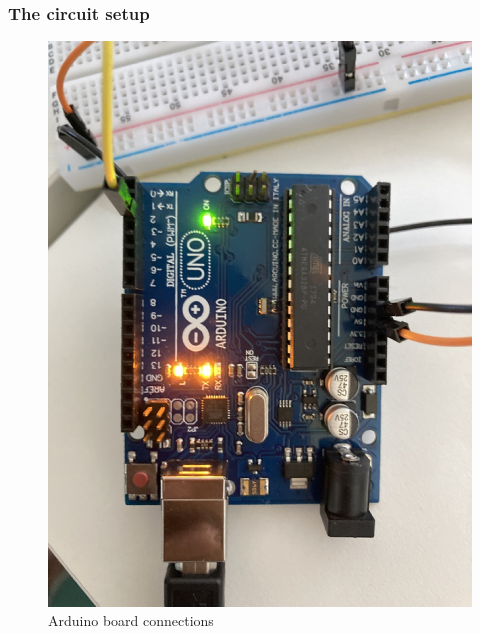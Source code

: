 \documentclass[12pt]{article}
\begin{document}
\subsubsection*{The circuit setup}
\begin{figure}[h!]
\centering
\includegraphics[scale=0.2, angle =90]{flowrate-ard.jpeg}
\caption{Arduino board connections}
\label{fig:awesome_image}
\end{figure}
\end{document}
